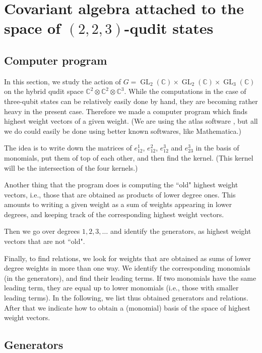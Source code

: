 \documentclass[reqno,11pt]{amsart}
\theoremstyle{remark}
\theoremstyle{definition}
\numberwithin{equation}{section}
\newcommand\GL{\operatorname{GL}}
\newcommand{\bbC}{\mathbb{C}}
\begin{document}
\section{Covariant algebra attached to the space of  $(2,2,3)$-qudit states}


\subsection{Computer program} In this section, we study the action of $G=\GL_2(\bbC)\times \GL_2(\bbC)\times\GL_3(\bbC)$ on the  hybrid qudit space
$\bbC^2\otimes\bbC^2\otimes\bbC^3$. 
While the computations in the case of 
three-qubit states can be relatively easily done by hand, they are becoming rather heavy in the present case. Therefore we made a computer program which finds highest weight vectors of a given weight. (We are using the atlas software \cite{atlas}, but all we do could easily be done using better known softwares, like Mathematica.) 

The idea is to write down the matrices of $e_{12}^1$, $e_{12}^2$, $e_{12}^3$ and $e_{23}^3$ in the basis of monomials, put them of top of each other, and then find the kernel. (This kernel will be the intersection of the four kernels.) 

Another thing that the program does is computing the ``old" highest weight vectors, i.e., those that are obtained as products of lower degree ones. This amounts to writing a given weight as a sum of weights appearing in lower degrees, and keeping track of the corresponding highest weight vectors. 

Then we go over degrees $1,2,3,\dots$ and identify the generators, as highest weight vectors that are not ``old".

Finally, to find relations, we look for weights that are obtained as sums of lower degree weights in more than one way. We identify the corresponding monomials (in the generators), and find their leading terms. If two monomials have the same leading term, they are equal up to lower monomials (i.e., those with smaller leading terms). In the following, we list thus obtained generators and relations. After that we indicate how to obtain a (monomial) basis of the space of highest weight vectors.

\subsection{Generators}\label{subsec:gens}


\bigskip
\bigskip
\end{document}
